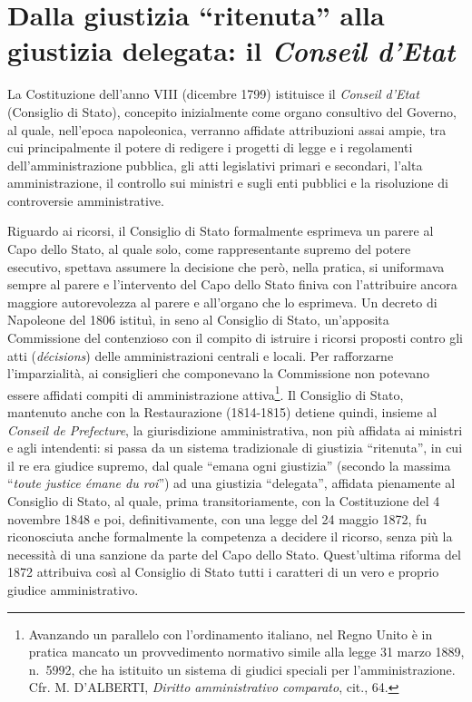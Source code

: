 \documentclass[12pt,it,a4paper,]{report}
\begin{document}
\hypertarget{dalla-giustizia-ritenuta-alla-giustizia-delegata-il-conseil-detat}{%
\section{\texorpdfstring{Dalla giustizia ``ritenuta'' alla giustizia
delegata: il \emph{Conseil
d'Etat}}{Dalla giustizia ``ritenuta'' alla giustizia delegata: il Conseil d'Etat}}\label{dalla-giustizia-ritenuta-alla-giustizia-delegata-il-conseil-detat}}

La Costituzione dell'anno VIII (dicembre 1799) istituisce il
\emph{Conseil d'Etat} (Consiglio di Stato), concepito inizialmente come
organo consultivo del Governo, al quale, nell'epoca napoleonica,
verranno affidate attribuzioni assai ampie, tra cui principalmente il
potere di redigere i progetti di legge e i regolamenti
dell'amministrazione pubblica, gli atti legislativi primari e secondari,
l'alta amministrazione, il controllo sui ministri e sugli enti pubblici
e la risoluzione di controversie amministrative.

Riguardo ai ricorsi, il Consiglio di Stato formalmente esprimeva un
parere al Capo dello Stato, al quale solo, come rappresentante supremo
del potere esecutivo, spettava assumere la decisione che però, nella
pratica, si uniformava sempre al parere e l'intervento del Capo dello
Stato finiva con l'attribuire ancora maggiore autorevolezza al parere e
all'organo che lo esprimeva. Un decreto di Napoleone del 1806 istituì,
in seno al Consiglio di Stato, un'apposita Commissione del contenzioso
con il compito di istruire i ricorsi proposti contro gli atti
(\emph{décisions}) delle amministrazioni centrali e locali. Per
rafforzarne l'imparzialità, ai consiglieri che componevano la
Commissione non potevano essere affidati compiti di amministrazione
attiva\footnote{Avanzando un parallelo con l'ordinamento italiano, nel
  Regno Unito è in pratica mancato un provvedimento normativo simile
  alla legge 31 marzo 1889, n.~5992, che ha istituito un sistema di
  giudici speciali per l'amministrazione. Cfr. M. D'ALBERTI,
  \emph{Diritto amministrativo comparato}, cit., 64.}. Il Consiglio di
Stato, mantenuto anche con la Restaurazione (1814-1815) detiene quindi,
insieme al \emph{Conseil de Prefecture}, la giurisdizione
amministrativa, non più affidata ai ministri e agli intendenti: si passa
da un sistema tradizionale di giustizia ``ritenuta'', in cui il re era
giudice supremo, dal quale ``emana ogni giustizia'' (secondo la massima
``\emph{toute justice émane du roi}'') ad una giustizia ``delegata'',
affidata pienamente al Consiglio di Stato, al quale, prima
transitoriamente, con la Costituzione del 4 novembre 1848 e poi,
definitivamente, con una legge del 24 maggio 1872, fu riconosciuta anche
formalmente la competenza a decidere il ricorso, senza più la necessità
di una sanzione da parte del Capo dello Stato. Quest'ultima riforma del
1872 attribuiva così al Consiglio di Stato tutti i caratteri di un vero
e proprio giudice amministrativo.
\end{document}
